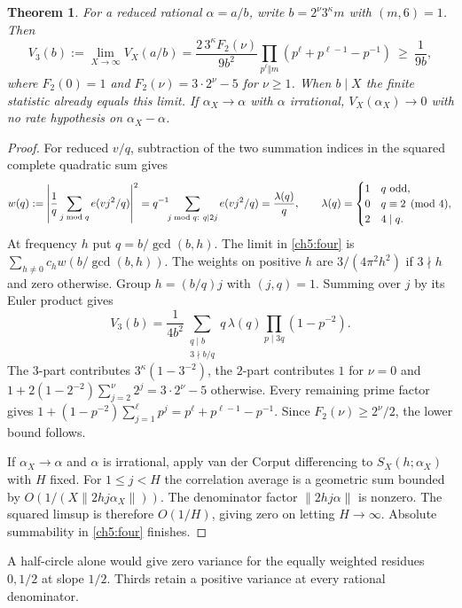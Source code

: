 \documentclass[11pt,a4paper,oneside,openany]{report}
\newtheorem{theorem}{Theorem}[section]
\theoremstyle{remark}\newtheorem{remark}[theorem]{Remark}
\numberwithin{equation}{section}
\begin{document}
\begin{theorem}\label{ch5:th:q}
For a reduced rational $\alpha=a/b$, write $b=2^\nu3^\kappa m$ with $(m,6)=1$. Then
\begin{equation}\label{ch5:vform}
 V_3(b):=\lim_{X\to\infty}V_X(a/b)
 =\frac{2\,3^\kappa F_2(\nu)}{9b^2}
   \prod_{p^\ell\Vert m}\left(p^\ell+p^{\ell-1}-p^{-1}\right)
 \ \ge\ \frac1{9b},
\end{equation}
where $F_2(0)=1$ and $F_2(\nu)=3\cdot2^\nu-5$ for $\nu\ge1$. When $b\mid X$ the finite statistic already equals this limit. If $\alpha_X\to\alpha$ with $\alpha$ irrational, $V_X(\alpha_X)\to0$ with no rate hypothesis on $\alpha_X-\alpha$.
\end{theorem}
\begin{proof}
For reduced $v/q$, subtraction of the two summation indices in the squared complete quadratic sum gives
\[
 w(q):=\left|\frac1q\sum_{j\bmod q}e(vj^2/q)\right|^2
 =q^{-1}\!\!\sum_{j\bmod q:\ q\mid2j}e(vj^2/q)
 =\frac{\lambda(q)}q,\qquad
 \lambda(q)=
 \begin{cases}1&q\ {\rm odd},\\0&q\equiv2\pmod4,\\2&4\mid q.\end{cases}
\]
At frequency $h$ put $q=b/\gcd(b,h)$. The limit in \eqref{ch5:four} is $\sum_{h\ne0}c_hw(b/\gcd(b,h))$. The weights on positive $h$ are $3/(4\pi^2h^2)$ if $3\nmid h$ and zero otherwise. Group $h=(b/q)j$ with $(j,q)=1$. Summing over $j$ by its Euler product gives
\[
 V_3(b)=\frac1{4b^2}
 \sum_{\substack{q\mid b\\3\nmid b/q}} q\,\lambda(q)
        \prod_{p\mid 3q}(1-p^{-2}).
\]
The $3$-part contributes $3^\kappa(1-3^{-2})$, the $2$-part contributes $1$ for $\nu=0$ and $1+2(1-2^{-2})\sum_{j=2}^\nu2^j=3\cdot2^\nu-5$ otherwise. Every remaining prime factor gives $1+(1-p^{-2})\sum_{j=1}^\ell p^j=p^\ell+p^{\ell-1}-p^{-1}$. Since $F_2(\nu)\ge 2^\nu/2$, the lower bound follows.

If $\alpha_X\to\alpha$ and $\alpha$ is irrational, apply van der Corput differencing to $S_X(h;\alpha_X)$ with $H$ fixed. For $1\le j<H$ the correlation average is a geometric sum bounded by $O(1/(X\|2hj\alpha_X\|))$. The denominator factor $\|2hj\alpha\|$ is nonzero. The squared limsup is therefore $O(1/H)$, giving zero on letting $H\to\infty$. Absolute summability in \eqref{ch5:four} finishes.
\end{proof}
A half-circle alone would give zero variance for the equally weighted residues $0,1/2$ at slope $1/2$. Thirds retain a positive variance at every rational denominator.
\end{document}
